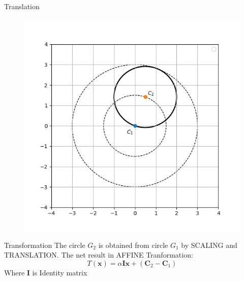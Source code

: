 \documentclass[10pt]{beamer}
\begin{document}
\begin{frame}{Translation}
 \begin{figure}[h]
\includegraphics[scale = 0.50]{s2_im3_show_translation.png}

\end{figure}
    
\end{frame}



\begin{frame}{Transformation}
The circle \(G_2\) is obtained from circle \(G_1\) by SCALING and TRANSLATION. The net result in AFFINE Tranformation:
\[T(\textbf{x}) = \alpha\textbf{I}\textbf{x} + (\textbf{C}_2 - \textbf{C}_1)
\]
Where \textbf{I} is Identity matrix

  
\end{frame}
\end{document}
